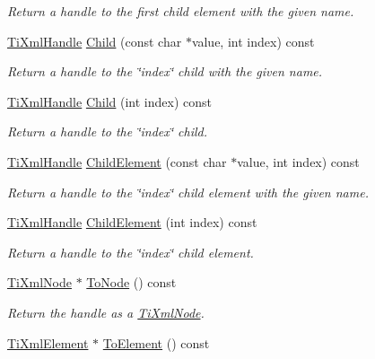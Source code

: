 \begin{DoxyCompactItemize}
\begin{DoxyCompactList}\small\item\em Return a handle to the first child element with the given name. \end{DoxyCompactList}\item 
\hyperlink{class_ti_xml_handle}{Ti\+Xml\+Handle} \hyperlink{class_ti_xml_handle_a072492b4be1acdb0db2d03cd8f71ccc4}{Child} (const char $\ast$value, int index) const 
\begin{DoxyCompactList}\small\item\em Return a handle to the \char`\"{}index\char`\"{} child with the given name. \end{DoxyCompactList}\item 
\hyperlink{class_ti_xml_handle}{Ti\+Xml\+Handle} \hyperlink{class_ti_xml_handle_af9cf6a7d08a5da94a8924425ad0cd5ac}{Child} (int index) const 
\begin{DoxyCompactList}\small\item\em Return a handle to the \char`\"{}index\char`\"{} child. \end{DoxyCompactList}\item 
\hyperlink{class_ti_xml_handle}{Ti\+Xml\+Handle} \hyperlink{class_ti_xml_handle_a979a3f850984a176ee884e394c7eed2d}{Child\+Element} (const char $\ast$value, int index) const 
\begin{DoxyCompactList}\small\item\em Return a handle to the \char`\"{}index\char`\"{} child element with the given name. \end{DoxyCompactList}\item 
\hyperlink{class_ti_xml_handle}{Ti\+Xml\+Handle} \hyperlink{class_ti_xml_handle_a8786475b9d1f1518492e3a46704c7ef0}{Child\+Element} (int index) const 
\begin{DoxyCompactList}\small\item\em Return a handle to the \char`\"{}index\char`\"{} child element. \end{DoxyCompactList}\item 
\hyperlink{class_ti_xml_node}{Ti\+Xml\+Node} $\ast$ \hyperlink{class_ti_xml_handle_af678e5088e83be67baf76f699756f2c3}{To\+Node} () const 
\begin{DoxyCompactList}\small\item\em Return the handle as a \hyperlink{class_ti_xml_node}{Ti\+Xml\+Node}. \end{DoxyCompactList}\item 
\hyperlink{class_ti_xml_element}{Ti\+Xml\+Element} $\ast$ \hyperlink{class_ti_xml_handle_abc6e7ed383a5fe1e52b0c0004b457b9e}{To\+Element} () const 

\end{DoxyCompactItemize}
